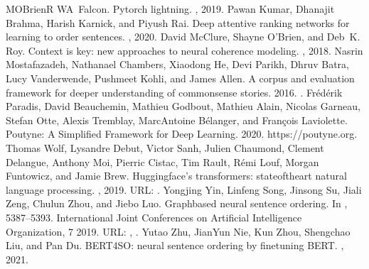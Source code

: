 \documentclass[letterpaper,10pt,english]{jupyterBook}
\begin{document}
\begin{sphinxthebibliography}{MOBrienR}
\sphinxAtStartPar
WA Falcon. Pytorch lightning. , 2019.
\sphinxAtStartPar
Pawan Kumar, Dhanajit Brahma, Harish Karnick, and Piyush Rai. Deep attentive ranking networks for learning to order sentences. , 2020.
\sphinxAtStartPar
David McClure, Shayne O'Brien, and Deb K. Roy. Context is key: new approaches to neural coherence modeling. , 2018.
\sphinxAtStartPar
Nasrin Mostafazadeh, Nathanael Chambers, Xiaodong He, Devi Parikh, Dhruv Batra, Lucy Vanderwende, Pushmeet Kohli, and James Allen. A corpus and evaluation framework for deeper understanding of commonsense stories. 2016. .
\sphinxAtStartPar
Frédérik Paradis, David Beauchemin, Mathieu Godbout, Mathieu Alain, Nicolas Garneau, Stefan Otte, Alexis Tremblay, Marc\sphinxhyphen{}Antoine Bélanger, and François Laviolette. Poutyne: A Simplified Framework for Deep Learning. 2020. https://poutyne.org.
\sphinxAtStartPar
Thomas Wolf, Lysandre Debut, Victor Sanh, Julien Chaumond, Clement Delangue, Anthony Moi, Pierric Cistac, Tim Rault, Rémi Louf, Morgan Funtowicz, and Jamie Brew. Huggingface's transformers: state\sphinxhyphen{}of\sphinxhyphen{}the\sphinxhyphen{}art natural language processing. , 2019. URL: .
\sphinxAtStartPar
Yongjing Yin, Linfeng Song, Jinsong Su, Jiali Zeng, Chulun Zhou, and Jiebo Luo. Graph\sphinxhyphen{}based neural sentence ordering. In , 5387–5393. International Joint Conferences on Artificial Intelligence Organization, 7 2019. URL: , .
\sphinxAtStartPar
Yutao Zhu, Jian\sphinxhyphen{}Yun Nie, Kun Zhou, Shengchao Liu, and Pan Du. BERT4SO: neural sentence ordering by fine\sphinxhyphen{}tuning BERT. , 2021.
\end{sphinxthebibliography}







\renewcommand{\indexname}{Index}
\printindex
\end{document}

